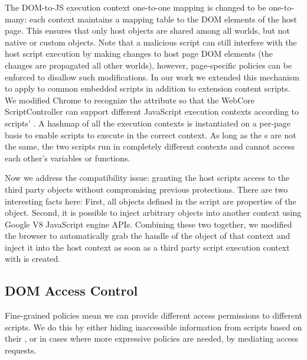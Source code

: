 The DOM-to-JS execution context one-to-one mapping is changed to be one-to-many: each context maintains a mapping table to the DOM elements of the host page.  This ensures that only host objects are shared among all worlds, but not native or custom objects.  Note that a malicious script can still interfere with the host script execution by making changes to host page DOM elements (the changes are propagated all other worlds), however, page-specific policies can be enforced to disallow such modifications.  In our work we extended this mechanism to apply to common embedded scripts in addition to extension content scripts.  We modified Chrome to recognize the attribute  so that the WebCore ScriptController can support different JavaScript execution contexts according to scripts' .  A hashmap of all the execution contexts is instantiated on a per-page basis to enable scripts to execute in the correct context.  As long as the s are not the same, the two scripts run in completely different contexts and cannot access each other's variables or functions. 

 Now we address the compatibility issue: granting the host scripts access to the third party objects without compromising previous protections.  There are two interesting facts here:  First, all objects defined in the script are properties of the  object.  Second, it is possible to inject arbitrary objects into another context using Google V8 JavaScript engine APIs.  Combining these two together, we modified the browser to automatically grab the handle of the  object of that context and inject it into the host context as soon as a third party script execution context with  is created.  

\subsection{DOM Access Control} 
Fine-grained policies mean we can provide different access permissions to different scripts.  We do this by either hiding inaccessible information from scripts based on their , or in cases where more expressive policies are needed, by mediating access requests.

